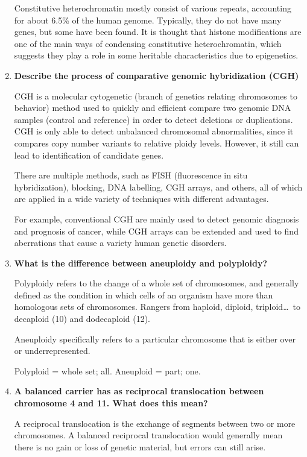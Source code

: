 \documentclass[plain,basic]{inVerba-notes}
\begin{document}
\begin{enumerate}
    Constitutive heterochromatin mostly consist of various repeats, accounting for about 6.5\% of the human genome. Typically, they do not have many genes, but some have been found. It is thought that histone modifications are one of the main ways of condensing constitutive heterochromatin, which suggests they play a role in some heritable characteristics due to epigenetics. 

    \item \textbf{Describe the process of comparative genomic hybridization (CGH)}
    
    CGH is a molecular cytogenetic (branch of genetics relating chromosomes to behavior) method used to quickly and efficient compare two genomic DNA samples (control and reference) in order to detect deletions or duplications. CGH is only able to detect unbalanced chromosomal abnormalities, since it compares copy number variants to relative ploidy levels. However, it still can lead to identification of candidate genes.

    There are multiple methods, such as FISH (fluorescence in situ hybridization), blocking, DNA labelling, CGH arrays, and others, all of which are applied in a wide variety of techniques with different advantages.

    For example, conventional CGH are mainly used to detect genomic diagnosis and prognosis of cancer, while CGH arrays can be extended and used to find aberrations that cause a variety human genetic disorders. 
    
    \item \textbf{What is the difference between aneuploidy and polyploidy?}
    
    Polyploidy refers to the change of a whole set of chromosomes, and generally defined as the condition in which cells of an organism have more than homologous sets of chromosomes. Rangers from haploid, diploid, triploid\dots\ to decaploid (10) and dodecaploid (12).

    Aneuploidy specifically refers to a particular chromosome that is either over or underrepresented. 

    Polyploid = whole set; all. Aneuploid = part; one.

    \item \textbf{A balanced carrier has as reciprocal translocation between chromosome 4 and 11. What does this mean?}
    
    A reciprocal translocation is the exchange of segments between two or more chromosomes. A balanced reciprocal translocation would generally mean there is no gain or loss of genetic material, but errors can still arise. 


\end{enumerate}
\end{document}
